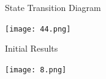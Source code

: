 \documentclass{beamer}
\begin{document}
\begin{frame}{State Transition Diagram}
\begin{center}
	\texttt{[image: 44.png]}	
\end{center}
\end{frame}





\begin{frame}{Initial Results}
\begin{center}
	\texttt{[image: 8.png]}	
\end{center}
\end{frame}







\end{document}
